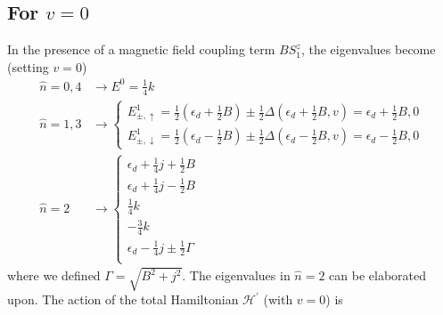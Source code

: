\documentclass[twoside,11pt]{report}
\numberwithin{equation}{section}
\begin{document}
\subsection{For \(v=0\)}
In the presence of a magnetic field coupling term \(B S^z_1\), the eigenvalues become (setting \(v = 0\))
\begin{equation}\begin{aligned}
\hat n=0,4 &\rightarrow E^0 = \frac{1}{4}k\\
\hat n=1,3 &\rightarrow \begin{cases}
	E^1_{\pm, \uparrow} = \frac{1}{2} \left(\epsilon_d + \frac{1}{2}B\right) \pm \frac{1}{2}\Delta\left(\epsilon_d + \frac{1}{2}B, v\right)  = \epsilon_d + \frac{1}{2}B, 0\\ 
	E^1_{\pm, \downarrow} = \frac{1}{2} \left(\epsilon_d - \frac{1}{2}B\right) \pm \frac{1}{2}\Delta\left(\epsilon_d - \frac{1}{2}B, v\right)  = \epsilon_d -\frac{1}{2}B, 0
	\end{cases}\\
	\hat n=2 &\rightarrow \begin{cases}
	\epsilon_d + \frac{1}{4}j + \frac{1}{2}B\\
	\epsilon_d + \frac{1}{4}j - \frac{1}{2}B\\
	\frac{1}{4}k \\
	-\frac{3}{4}k \\
	\epsilon_d -\frac{1}{4}j \pm \frac{1}{2} \Gamma \\
\end{cases}
\end{aligned}\end{equation}
where we defined \(\Gamma = \sqrt{B^2 + j^2}\). The eigenvalues in \(\hat n=2\) can be elaborated upon. The action of the total Hamiltonian \(\mathcal{H}^\prime\) (with \(v=0\)) is
\end{document}
